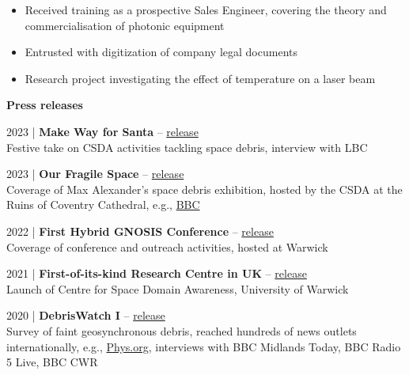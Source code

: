 \documentclass[10pt,a4paper]{altacv}
\begin{document}
\divider

\begin{itemize}
	\item Received training as a prospective Sales Engineer, covering the theory and commercialisation of photonic equipment
	\item Entrusted with digitization of company legal documents 
	\item Research project investigating the effect of temperature on a laser beam
\end{itemize}

\medskip


\normalsize \textbf{Press releases}

\medskip

\small 2023 | \textbf{Make Way for Santa} -- \href{https://warwick.ac.uk/newsandevents/pressreleases/?newsItem=8a17841a8c5ec9b4018c7c17174f7161}{release} \\
Festive take on CSDA activities tackling space debris, interview with LBC

\smallskip

\small 2023 | \textbf{Our Fragile Space} -- \href{https://www.resonatefestival.co.uk/events/our-fragile-space}{release} \\
Coverage of Max Alexander's space debris exhibition, hosted by the CSDA at the Ruins of Coventry Cathedral, e.g., 
\href{https://www.bbc.co.uk/news/uk-england-coventry-warwickshire-65497564}{BBC}

\smallskip

\small 2022 | \textbf{First Hybrid GNOSIS Conference} -- \href{https://warwick.ac.uk/fac/sci/physics/news/?newsItem=8a1785d784ecef360184f693fbda6262}{release} \\
Coverage of conference and outreach activities, hosted at Warwick

\smallskip

\small 2021 | \textbf{First-of-its-kind Research Centre in UK} -- \href{https://warwick.ac.uk/newsandevents/pressreleases/space_junk_traffic/}{release} \\
Launch of Centre for Space Domain Awareness, University of Warwick

\smallskip

\small 2020 | \textbf{DebrisWatch I} -- \href{https://warwick.ac.uk/newsandevents/pressreleases/faint_orbital_debris/}{release} \\
Survey of faint geosynchronous debris, reached hundreds of news outlets internationally, e.g., \href{https://phys.org/news/2022-03-sustainable-space-environment.html}{Phys.org}, interviews with BBC Midlands Today, BBC Radio 5 Live, BBC CWR
\end{document}
